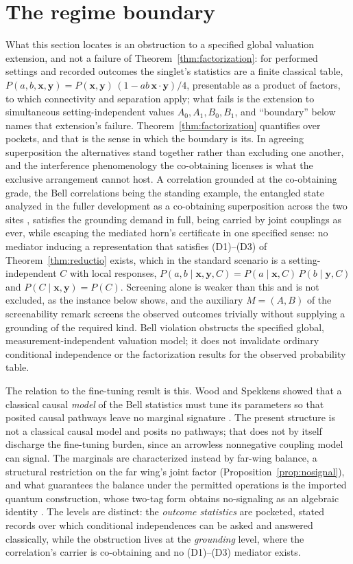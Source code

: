 \documentclass[11pt]{article}
\begin{document}
\section{The regime boundary} \label{sec:boundary} What this section locates is an obstruction to a specified global valuation extension, and not a failure of Theorem~\ref{thm:factorization}: for performed settings and recorded outcomes the singlet's statistics are a finite classical table, $P(a, b, \mathbf{x}, \mathbf{y}) = P(\mathbf{x}, \mathbf{y})\,(1 - ab\,\mathbf{x}\cdot\mathbf{y})/4$, presentable as a product of factors, to which connectivity and separation apply; what fails is the extension to simultaneous setting-independent values $A_0, A_1, B_0, B_1$, and ``boundary'' below names that extension's failure. Theorem~\ref{thm:factorization} quantifies over pockets, and that is the sense in which the boundary is its. In agreeing superposition the alternatives stand together rather than excluding one another, and the interference phenomenology the co-obtaining licenses is what the exclusive arrangement cannot host. A correlation grounded at the co-obtaining grade, the Bell correlations being the standing example, the entangled state analyzed in the fuller development as a co-obtaining superposition across the two sites \cite{Aethus}, satisfies the grounding demand in full, being carried by joint couplings as ever, while escaping the mediated horn's certificate in one specified sense: no mediator inducing a representation that satisfies (D1)--(D3) of Theorem~\ref{thm:reductio} exists, which in the standard scenario is a setting-independent $C$ with local responses, $P(a, b \mid \mathbf{x}, \mathbf{y}, C) = P(a \mid \mathbf{x}, C)\,P(b \mid \mathbf{y}, C)$ and $P(C \mid \mathbf{x}, \mathbf{y}) = P(C)$. Screening alone is weaker than this and is not excluded, as the instance below shows, and the auxiliary $M = (A, B)$ of the screenability remark screens the observed outcomes trivially without supplying a grounding of the required kind. Bell violation obstructs the specified global, measurement-independent valuation model; it does not invalidate ordinary conditional independence or the factorization results for the observed probability table.

The relation to the fine-tuning result is this. Wood and Spekkens showed that a classical causal \emph{model} of the Bell statistics must tune its parameters so that posited causal pathways leave no marginal signature \cite{wood_spekkens_2015}. The present structure is not a classical causal model and posits no pathways; that does not by itself discharge the fine-tuning burden, since an arrowless nonnegative coupling model can signal. The marginals are characterized instead by far-wing balance, a structural restriction on the far wing's joint factor (Proposition~\ref{prop:nosignal}), and what guarantees the balance under the permitted operations is the imported quantum construction, whose two-tag form obtains no-signaling as an algebraic identity \cite{AethusQuant}. The levels are distinct: the \emph{outcome statistics} are pocketed, stated records over which conditional independences can be asked and answered classically, while the obstruction lives at the \emph{grounding} level, where the correlation's carrier is co-obtaining and no (D1)--(D3) mediator exists.
\end{document}
